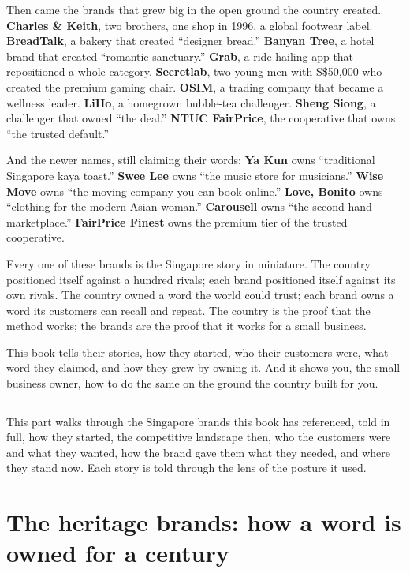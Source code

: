 \documentclass[10pt,twoside,openany]{memoir}
\begin{document}
Then came the brands that grew big in the open ground the country
created. \textbf{Charles \& Keith}, two brothers, one shop in 1996, a
global footwear label. \textbf{BreadTalk}, a bakery that created
``designer bread.'' \textbf{Banyan Tree}, a hotel brand that created
``romantic sanctuary.'' \textbf{Grab}, a ride-hailing app that
repositioned a whole category. \textbf{Secretlab}, two young men with
S\$50,000 who created the premium gaming chair. \textbf{OSIM}, a trading
company that became a wellness leader. \textbf{LiHo}, a homegrown
bubble-tea challenger. \textbf{Sheng Siong}, a challenger that owned
``the deal.'' \textbf{NTUC FairPrice}, the cooperative that owns ``the
trusted default.''

And the newer names, still claiming their words: \textbf{Ya Kun} owns
``traditional Singapore kaya toast.'' \textbf{Swee Lee} owns ``the music
store for musicians.'' \textbf{Wise Move} owns ``the moving company you
can book online.'' \textbf{Love, Bonito} owns ``clothing for the modern
Asian woman.'' \textbf{Carousell} owns ``the second-hand marketplace.''
\textbf{FairPrice Finest} owns the premium tier of the trusted
cooperative.

Every one of these brands is the Singapore story in miniature. The
country positioned itself against a hundred rivals; each brand
positioned itself against its own rivals. The country owned a word the
world could trust; each brand owns a word its customers can recall and
repeat. The country is the proof that the method works; the brands are
the proof that it works for a small business.

This book tells their stories, how they started, who their customers
were, what word they claimed, and how they grew by owning it. And it
shows you, the small business owner, how to do the same on the ground
the country built for you.

\begin{center}\rule{0.5\linewidth}{0.5pt}\end{center}

This part walks through the Singapore brands this book has referenced,
told in full, how they started, the competitive landscape then, who the
customers were and what they wanted, how the brand gave them what they
needed, and where they stand now. Each story is told through the lens of
the posture it used.

\FloatBarrier
\chapter{The heritage brands: how a word is owned for a
century}\label{the-heritage-brands-how-a-word-is-owned-for-a-century}
\end{document}
